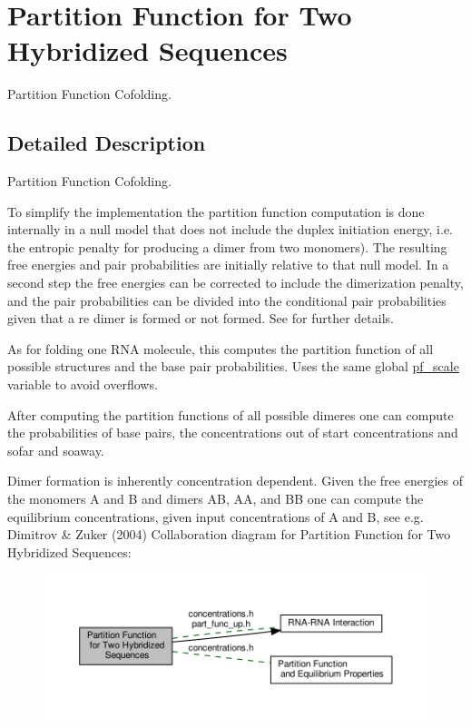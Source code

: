 \hypertarget{group__pf__cofold}{}\section{Partition Function for Two Hybridized Sequences}
\label{group__pf__cofold}


Partition Function Cofolding.  




\subsection{Detailed Description}
Partition Function Cofolding. 

To simplify the implementation the partition function computation is done internally in a null model that does not include the duplex initiation energy, i.\+e. the entropic penalty for producing a dimer from two monomers). The resulting free energies and pair probabilities are initially relative to that null model. In a second step the free energies can be corrected to include the dimerization penalty, and the pair probabilities can be divided into the conditional pair probabilities given that a re dimer is formed or not formed. See \cite{bernhart:2006} for further details.

As for folding one R\+NA molecule, this computes the partition function of all possible structures and the base pair probabilities. Uses the same global \hyperlink{group__model__details_gad3b22044065acc6dee0af68931b52cfd}{pf\+\_\+scale} variable to avoid overflows.

After computing the partition functions of all possible dimeres one can compute the probabilities of base pairs, the concentrations out of start concentrations and sofar and soaway.

Dimer formation is inherently concentration dependent. Given the free energies of the monomers A and B and dimers AB, AA, and BB one can compute the equilibrium concentrations, given input concentrations of A and B, see e.\+g. Dimitrov \& Zuker (2004) Collaboration diagram for Partition Function for Two Hybridized Sequences\+:
\nopagebreak
\begin{figure}[H]
\begin{center}
\leavevmode
\includegraphics[width=350pt]{group__pf__cofold}
\end{center}
\end{figure}
